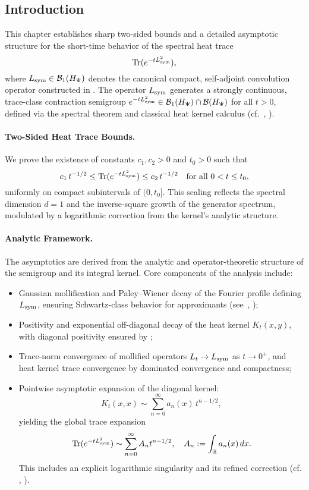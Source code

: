 \subsection*{Introduction}

This chapter establishes sharp two-sided bounds and a detailed asymptotic structure for the short-time behavior of the spectral heat trace
\[
\operatorname{Tr}(e^{-t L_{\mathrm{sym}}^2}),
\]
where \( L_{\mathrm{sym}} \in \mathcal{B}_1(H_{\Psi}) \) denotes the canonical compact, self-adjoint convolution operator constructed in . The operator \( L_{\mathrm{sym}} \) generates a strongly continuous, trace-class contraction semigroup \( e^{-tL_{\mathrm{sym}}^2} \in \mathcal{B}_1(H_{\Psi}) \cap \mathcal{B}(H_{\Psi}) \) for all \( t > 0 \), defined via the spectral theorem and classical heat kernel calculus (cf.~\cite[Ch.~X]{ReedSimon1978IV}, \cite[Ch.~3]{Simon2005TraceIdeals}).

\paragraph{Two-Sided Heat Trace Bounds.}
We prove the existence of constants \( c_1, c_2 > 0 \) and \( t_0 > 0 \) such that
\[
c_1\, t^{-1/2} \le \operatorname{Tr}(e^{-t L_{\mathrm{sym}}^2}) \le c_2\, t^{-1/2}
\quad \text{for all } 0 < t \le t_0,
\]
uniformly on compact subintervals of \( (0, t_0] \). This scaling reflects the spectral dimension \( d = 1 \) and the inverse-square growth of the generator spectrum, modulated by a logarithmic correction from the kernel's analytic structure.

\paragraph{Analytic Framework.}
The asymptotics are derived from the analytic and operator-theoretic structure of the semigroup and its integral kernel. Core components of the analysis include:
\begin{itemize}
  \item Gaussian mollification and Paley--Wiener decay of the Fourier profile defining \( L_{\mathrm{sym}} \), ensuring Schwartz-class behavior for approximants (see~\cite[Ch.~IX]{ReedSimon1975II}, \cite[Ch.~9]{Levin1996EntireLectures});
  \item Positivity and exponential off-diagonal decay of the heat kernel \( K_t(x, y) \), with diagonal positivity ensured by ;
  \item Trace-norm convergence of mollified operators \( L_t \to L_{\mathrm{sym}} \) as \( t \to 0^+ \), and heat kernel trace convergence by dominated convergence and compactness;
  \item Pointwise asymptotic expansion of the diagonal kernel:
  \[
  K_t(x,x) \sim \sum_{n=0}^\infty a_n(x)\, t^{n - 1/2},
  \]
  yielding the global trace expansion
  \[
  \operatorname{Tr}(e^{-t L_{\mathrm{sym}}^2}) \sim \sum_{n=0}^\infty A_n t^{n - 1/2},
  \quad A_n := \int_{\mathbb{R}} a_n(x)\,dx.
  \]
  This includes an explicit logarithmic singularity and its refined correction (cf. , ).
\end{itemize}

